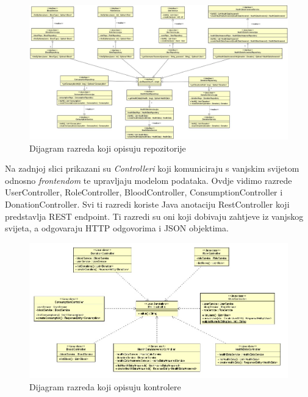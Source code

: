 \begin{figure}[H]
	\centering
	\includegraphics[width=\textwidth, scale=2.0]{dijagrami/dijagram_razreda2}
	\caption{Dijagram razreda koji opisuju repozitorije}
	\label{fig:dijagram_repozitorija}
\end{figure}

\eject

	Na zadnjoj slici prikazani su \textit{Controlleri} koji komuniciraju s vanjskim svijetom odnosno \textit{frontendom} te upravljaju modelom podataka. Ovdje vidimo razrede UserController, RoleController, BloodController, ConsumptionController i DonationController. Svi ti razredi koriste Java anotaciju RestController koji predstavlja REST endpoint. Ti razredi su oni koji dobivaju zahtjeve iz vanjskog svijeta, a odgovaraju HTTP odgovorima i JSON objektima.
	
\begin{figure}[H]
	\centering
	\includegraphics[width=\textwidth, scale=0.5]{dijagrami/dijagram_razreda3}
	\caption{Dijagram razreda koji opisuju kontrolere}
	\label{fig:dijagram_kontrolera}
\end{figure}

\eject
			
